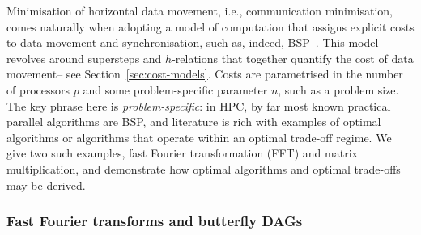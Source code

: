 \documentclass[oneside,reqno, a4paper]{amsart}
\numberwithin{equation}{section}
\begin{document}
Minimisation of horizontal data movement, i.e., communication minimisation, comes naturally when adopting a model of computation that assigns explicit costs to data movement and synchronisation,
such as,
indeed,
BSP~\cite{valiant90}.
This model revolves around supersteps and $h$-relations that together quantify the cost of data movement-- see Section~\ref{sec:cost-models}.
Costs are parametrised in the number of processors $p$ and some problem-specific parameter $n$, such as a problem size.
The key phrase here is \emph{problem-specific}:
in HPC, by far most known practical parallel algorithms are %
BSP, and
literature is rich with examples of optimal algorithms or algorithms that operate within an optimal trade-off regime.
We give two such examples,
fast Fourier transformation (FFT) and matrix multiplication, and
demonstrate how optimal algorithms and optimal trade-offs may be derived.

\subsubsection*{Fast Fourier transforms and butterfly DAGs}
\end{document}

